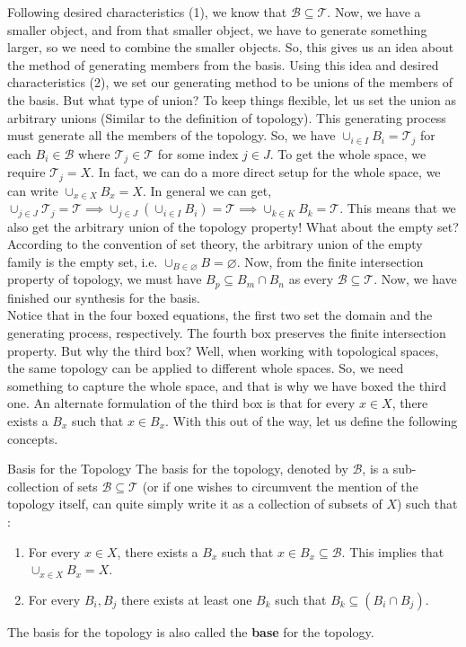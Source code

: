 Following desired characteristics (1), we know that $\boxed{\mathcal{B}\subseteq\mathcal{T}}$. Now, we have a smaller object, and from that smaller object, we have to generate something larger, so we need to combine the smaller objects. So, this gives us an idea about the method of generating members from the basis. Using this idea and desired characteristics (2), we set our generating method to be unions of the members of the basis. But what type of union? To keep things flexible, let us set the union as arbitrary unions (Similar to the definition of topology). This generating process must generate all the members of the topology. So, we have $\boxed{\cup_{i\in I}B_i=\mathcal{T}_j}$ for each $B_i\in\mathcal{B}$ where $\mathcal{T}_j\in\mathcal{T}$ for some index $j\in J$. To get the whole space, we require $\mathcal{T}_j=X$. In fact, we can do a more direct setup for the whole space, we can write $\boxed{\cup_{x\in X}B_x=X}$. In general we can get, $\cup_{j\in J}\mathcal{T}_j=\mathcal{T}\implies\cup_{j\in J}(\cup_{i\in I}B_i)=\mathcal{T}\implies\cup_{k\in K}B_k=\mathcal{T}$. This means that we also get the arbitrary union of the topology property! What about the empty set? According to the convention of set theory, the arbitrary union of the empty family is the empty set, i.e. $\cup_{B\in\varnothing}B=\varnothing$. Now, from the finite intersection property of topology, we must have $\boxed{B_p\subseteq B_m\cap B_n}$ as every $\mathcal{B}\subseteq\mathcal{T}$. Now, we have finished our synthesis for the basis.\\
Notice that in the four boxed equations, the first two set the domain and the generating process, respectively. The fourth box preserves the finite intersection property. But why the third box? Well, when working with topological spaces, the same topology can be applied to different whole spaces. So, we need something to capture the whole space, and that is why we have boxed the third one. An alternate formulation of the third box is that for every $x\in X$, there exists a $B_x$ such that $x\in B_x$. With this out of the way, let us define the following concepts.
\begin{Definition}{Basis for the Topology}\label{basis_topology}
    The basis for the topology, denoted by $\mathcal{B}$, is a sub-collection of sets $\mathcal{B}\subseteq\mathcal{T}$ (or if one wishes to circumvent the mention of the topology itself, can quite simply write it as a collection of subsets of $X$) such that :
    \begin{enumerate}
        \item For every $x\in X$, there exists a $B_x$ such that $x\in B_x\subseteq\mathcal{B}$. This implies that $\cup_{x\in X}B_x=X$.
        \item For every $B_i, B_j$ there exists at least one $B_k$ such that $B_k\subseteq(B_i\cap B_j)$.
    \end{enumerate}
    The basis for the topology is also called the \textbf{base} for the topology.
\end{Definition}
